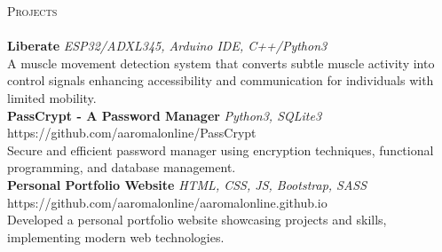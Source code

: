 \documentclass[a4paper]{article}
\newcommand{\lineunder} {
    \vspace*{-8pt} \\
    \hspace*{-18pt} \hrulefill \\
}
\newcommand{\header} [1] {
    {\hspace*{-18pt}\vspace*{6pt} \textsc{#1}}
    \vspace*{-6pt} \lineunder
}
\begin{document}
\header{Projects}
{\textbf{Liberate}} {\sl ESP32/ADXL345, Arduino IDE, C++/Python3} \\
A muscle movement detection system that converts subtle muscle activity into control signals enhancing accessibility and communication for individuals with limited mobility.\\
\vspace*{2mm}
{\textbf{PassCrypt - A Password Manager}} {\sl Python3, SQLite3} \hfill https://github.com/aaromalonline/PassCrypt\\
Secure and efficient password manager using encryption techniques, functional programming, and database management.\\
\vspace*{2mm}
{\textbf{Personal Portfolio Website}} {\sl HTML, CSS, JS, Bootstrap, SASS} \hfill https://github.com/aaromalonline/aaromalonline.github.io\\
Developed a personal portfolio website showcasing projects and skills, implementing modern web technologies.\\
\vspace*{2mm}
\end{document}
